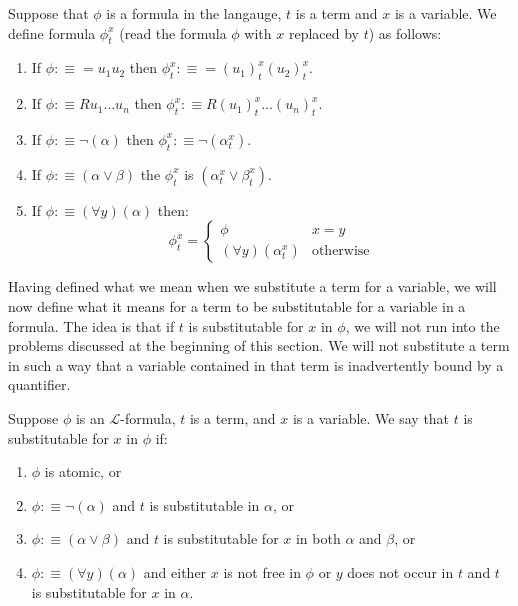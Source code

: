 \documentclass[9pt,a4paper, twocolumn]{article}
\newcommand{\curveL}{\mathcal{L}}
\begin{document}
            \begin{define}
                Suppose that $\phi$ is a formula in the langauge, $t$ is a term and $x$ is a variable. We define formula $\phi_t^x$ (read the formula $\phi$ with $x$ replaced by $t$) as follows:
                \begin{enumerate}
                    \item If $\phi:\equiv =u_1u_2$ then $\phi_t^x:\equiv = (u_1)_t^x(u_2)_t^x$.
                    \item If $\phi:\equiv Ru_1\dots u_n$ then $\phi_t^x :\equiv R(u_1)_t^x\dots (u_n)_t^x$.
                    \item If $\phi:\equiv \neg(\alpha)$ then $\phi_t^x:\equiv \neg(\alpha_t^x)$.
                    \item If $\phi:\equiv (\alpha\lor\beta)$ the $\phi_t^x$ is $(\alpha_t^x\lor\beta_t^x)$.
                    \item If $\phi:\equiv (\forall y)(\alpha)$ then:
                    $$
                    \phi_t^x = \left\{ \begin{matrix} \phi & x = y \\ (\forall y)(\alpha_t^x) &\text{otherwise}\end{matrix} \right.
                    $$
                \end{enumerate}
            \end{define}
            Having defined what we mean when we substitute a term for a variable, we will now define what it means for a term to be substitutable for a variable in a formula. The idea is that if $t$ is substitutable for $x$ in $\phi$, we will not run into the problems discussed at the beginning of this section. We will not substitute a term in such a way that a variable contained in that term is inadvertently bound by a quantifier.
            \begin{define}
                Suppose $\phi$ is an $\curveL$-formula, $t$ is a term, and $x$ is a variable. We say that $t$ is substitutable for $x$ in $\phi$ if:
                \begin{enumerate}
                    \item $\phi$ is atomic, or
                    \item $\phi:\equiv \neg(\alpha)$ and $t$ is substitutable in $\alpha$, or
                    \item $\phi:\equiv (\alpha\lor\beta)$ and $t$ is substitutable for $x$ in both $\alpha$ and $\beta$, or
                    \item $\phi:\equiv (\forall y)(\alpha)$ and either $x$ is not free in $\phi$ or $y$ does not occur in $t$ and $t$ is substitutable for $x$ in $\alpha$.
                \end{enumerate}
            \end{define}
\end{document}

